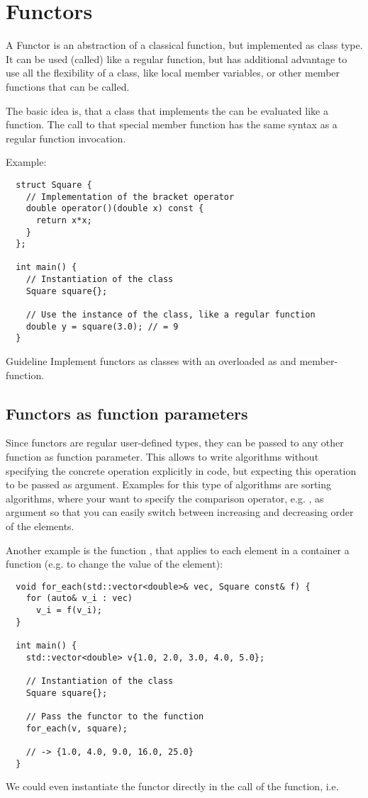 \chapter{Functors}
A Functor is an abstraction of a classical function, but implemented as class type. It can be used (called) like a regular function, but has additional
advantage to use all the flexibility of a class, like local member variables, or other member functions that can be called.

The basic idea is, that a class that implements the  can be evaluated like a function. The call to that special member function has the same
syntax as a regular function invocation.

Example:
\begin{verbatim}
  struct Square {
    // Implementation of the bracket operator
    double operator()(double x) const {
      return x*x;
    }
  };

  int main() {
    // Instantiation of the class
    Square square{};

    // Use the instance of the class, like a regular function
    double y = square(3.0); // = 9
  }
\end{verbatim}

\begin{guideline}{Guideline}
  Implement functors as classes with an overloaded  as  and  member-function.
\end{guideline}

\section{Functors as function parameters}
Since functors are regular user-defined types, they can be passed to any other function as function parameter. This allows to write algorithms
without specifying the concrete operation explicitly in code, but expecting this operation to be passed as argument. Examples for this type
of algorithms are sorting algorithms, where your want to specify the comparison operator, e.g. , as argument so that you
can easily switch between increasing and decreasing order of the elements.

Another example is the function , that applies to each element in a container a function (e.g. to change the value of the element):
\begin{verbatim}
  void for_each(std::vector<double>& vec, Square const& f) {
    for (auto& v_i : vec)
      v_i = f(v_i);
  }

  int main() {
    std::vector<double> v{1.0, 2.0, 3.0, 4.0, 5.0};

    // Instantiation of the class
    Square square{};

    // Pass the functor to the function
    for_each(v, square);

    // -> {1.0, 4.0, 9.0, 16.0, 25.0}
  }
\end{verbatim}
%
We could even instantiate the functor directly in the call of the  function, i.e.

